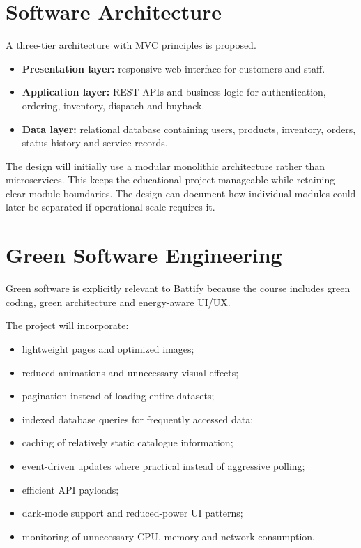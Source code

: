 \documentclass[11pt,a4paper]{article}
\begin{document}
\section{Software Architecture}

A three-tier architecture with MVC principles is proposed.

\begin{itemize}[leftmargin=0.7cm]
    \item \textbf{Presentation layer:} responsive web interface for customers
    and staff.
    \item \textbf{Application layer:} REST APIs and business logic for
    authentication, ordering, inventory, dispatch and buyback.
    \item \textbf{Data layer:} relational database containing users, products,
    inventory, orders, status history and service records.
\end{itemize}

The design will initially use a modular monolithic architecture rather than
microservices. This keeps the educational project manageable while retaining
clear module boundaries. The design can document how individual modules could
later be separated if operational scale requires it.

\section{Green Software Engineering}

Green software is explicitly relevant to Battify because the course includes
green coding, green architecture and energy-aware UI/UX.

The project will incorporate:

\begin{itemize}[leftmargin=0.7cm]
    \item lightweight pages and optimized images;
    \item reduced animations and unnecessary visual effects;
    \item pagination instead of loading entire datasets;
    \item indexed database queries for frequently accessed data;
    \item caching of relatively static catalogue information;
    \item event-driven updates where practical instead of aggressive polling;
    \item efficient API payloads;
    \item dark-mode support and reduced-power UI patterns;
    \item monitoring of unnecessary CPU, memory and network consumption.
\end{itemize}
\end{document}
